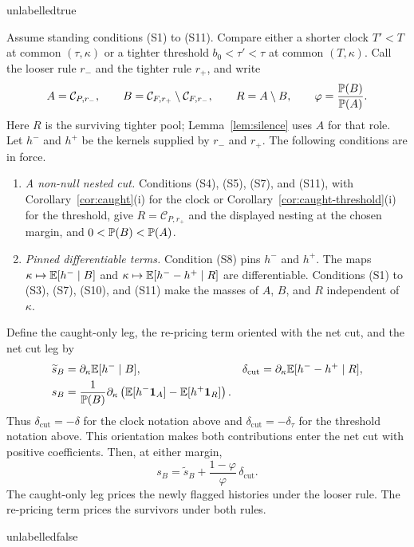 \csname unlabelledtrue\endcsname
\begin{lemma}
\label{lem:cut-split}
Assume standing conditions (S1) to (S11). Compare either a shorter clock $T'<T$ at common
$(\tau,\kappa)$ or a tighter threshold $b_0<\tau'<\tau$ at common $(T,\kappa)$. Call the looser rule
$r_-$ and the tighter rule $r_+$, and write
\[
A=\mathcal C_{P,r_-},
\qquad
B=\mathcal C_{F,r_+}\setminus\mathcal C_{F,r_-},
\qquad
R=A\setminus B,
\qquad
\varphi=\frac{\mathbb{P}(B)}{\mathbb{P}(A)}.
\]
Here $R$ is the surviving tighter pool; Lemma~\ref{lem:silence} uses $A$ for that role.
Let $h^-$ and $h^+$ be the kernels supplied by $r_-$ and $r_+$. The following conditions are in
force.
\begin{enumerate}[label=(K-\arabic*),leftmargin=3.2em,itemsep=3pt]
\item \emph{A non-null nested cut.} Conditions (S4), (S5), (S7), and (S11), with
  Corollary~\ref{cor:caught}(i) for the clock or Corollary~\ref{cor:caught-threshold}(i) for the
  threshold, give $R=\mathcal C_{P,r_+}$ and the displayed nesting at the chosen margin, and
  $0<\mathbb{P}(B)<\mathbb{P}(A)$.
\item \emph{Pinned differentiable terms.} Condition (S8) pins $h^-$ and $h^+$. The maps
  $\kappa\mapsto\mathbb{E}[h^-\mid B]$ and
  $\kappa\mapsto\mathbb{E}[h^- -h^+\mid R]$ are differentiable. Conditions (S1) to (S3), (S7),
  (S10), and (S11) make the masses of $A$, $B$, and $R$ independent of $\kappa$.
\end{enumerate}
Define the caught-only leg, the re-pricing term oriented with the net cut, and the net cut leg by
\begin{align}
\label{eq:cut-split-definitions}
\widetilde s_B&=\partial_\kappa\mathbb{E}[h^-\mid B],
&\delta_{\mathrm{cut}}&=\partial_\kappa\mathbb{E}[h^- -h^+\mid R],
\nonumber\\
s_B&=\frac{1}{\mathbb{P}(B)}\partial_\kappa
\left(\mathbb{E}[h^-\mathbf{1}_A]-\mathbb{E}[h^+\mathbf{1}_R]\right).
\end{align}
Thus $\delta_{\mathrm{cut}}=-\delta$ for the clock notation above and
$\delta_{\mathrm{cut}}=-\delta_\tau$ for the threshold notation above. This orientation makes both
contributions enter the net cut with positive coefficients.
Then, at either margin,
\begin{equation}
\label{eq:cut-split-both}
s_B=\widetilde s_B+\frac{1-\varphi}{\varphi}\,\delta_{\mathrm{cut}}.
\end{equation}
The caught-only leg prices the newly flagged histories under the looser rule. The re-pricing term
prices the survivors under both rules.
\end{lemma}
\csname unlabelledfalse\endcsname

